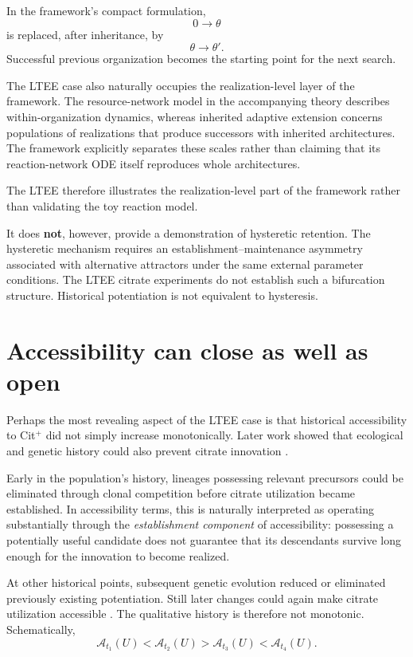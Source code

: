 \documentclass[11pt]{article}
\begin{document}
In the framework's compact formulation,
\[
0\longrightarrow\theta
\]
is replaced, after inheritance, by
\[
\theta\longrightarrow\theta'.
\]
Successful previous organization becomes the starting point for the next search.

The LTEE case also naturally occupies the realization-level layer of the framework. The resource-network model in the accompanying theory describes within-organization dynamics, whereas inherited adaptive extension concerns populations of realizations that produce successors with inherited architectures. The framework explicitly separates these scales rather than claiming that its reaction-network ODE itself reproduces whole architectures.

The LTEE therefore illustrates the realization-level part of the framework rather than validating the toy reaction model.

It does \textbf{not}, however, provide a demonstration of hysteretic retention. The hysteretic mechanism requires an establishment--maintenance asymmetry associated with alternative attractors under the same external parameter conditions. The LTEE citrate experiments do not establish such a bifurcation structure. Historical potentiation is not equivalent to hysteresis.

\section{Accessibility can close as well as open}

Perhaps the most revealing aspect of the LTEE case is that historical accessibility to Cit$^{+}$ did not simply increase monotonically. Later work showed that ecological and genetic history could also prevent citrate innovation \cite{Leon2018}.

Early in the population's history, lineages possessing relevant precursors could be eliminated through clonal competition before citrate utilization became established. In accessibility terms, this is naturally interpreted as operating substantially through the \emph{establishment component} of accessibility: possessing a potentially useful candidate does not guarantee that its descendants survive long enough for the innovation to become realized.

At other historical points, subsequent genetic evolution reduced or eliminated previously existing potentiation. Still later changes could again make citrate utilization accessible \cite{Leon2018}. The qualitative history is therefore not monotonic. Schematically,
\[
\mathcal A_{t_1}(U)
<
\mathcal A_{t_2}(U)
>
\mathcal A_{t_3}(U)
<
\mathcal A_{t_4}(U).
\]
\end{document}
